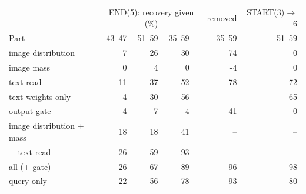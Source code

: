 \begin{tabular}{lrrrrrr}
\toprule
 & \multicolumn{4}{c}{END(5): recovery given (\%)} & removed & START(3)$\to$6 \\
Part & 43--47 & 51--59 & 35--59 & & 35--59 & 51--59 \\
\midrule
image distribution & 7 & 26 & 30 & & 74 & 0 \\
image mass & 0 & 4 & 0 & & -4 & 0 \\
text read & 11 & 37 & 52 & & 78 & 72 \\
\quad text weights only & 4 & 30 & 56 & & -- & 65 \\
output gate & 4 & 7 & 4 & & 41 & 0 \\
image distribution + mass & 18 & 18 & 41 & & -- & -- \\
+ text read & 26 & 59 & 93 & & -- & -- \\
all (+ gate) & 26 & 67 & 89 & & 96 & 98 \\
\addlinespace
query only & 22 & 56 & 78 & & 93 & 80 \\
\bottomrule
\end{tabular}
